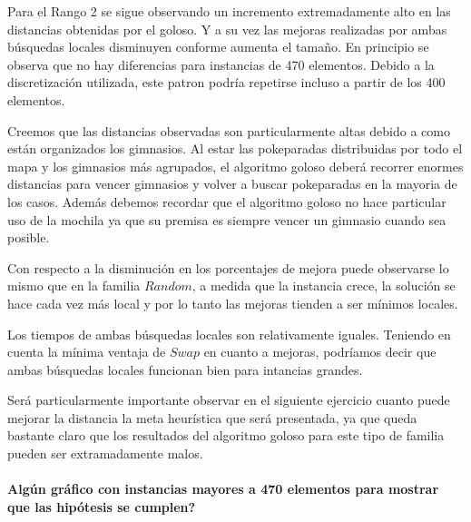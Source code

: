 Para el Rango 2 se sigue observando un incremento extremadamente alto en las distancias obtenidas por el goloso. Y a su vez las mejoras realizadas por ambas búsquedas locales disminuyen conforme aumenta el tamaño. En principio se observa que no hay diferencias para instancias de 470 elementos. Debido a la discretización utilizada, este patron podría repetirse incluso a partir de los 400 elementos.

Creemos que las distancias observadas son particularmente altas debido a como están organizados los gimnasios. Al estar las pokeparadas distribuidas por todo el mapa y los gimnasios más agrupados, el algoritmo goloso deberá recorrer enormes distancias para vencer gimnasios y volver a buscar pokeparadas en la mayoria de los casos. Además debemos recordar que el algoritmo goloso no hace particular uso de la mochila ya que su premisa es siempre vencer un gimnasio cuando sea posible.

Con respecto a la disminución en los porcentajes de mejora puede observarse lo mismo que en la familia $Random$, a medida que la instancia crece, la solución se hace cada vez más local y por lo tanto las mejoras tienden a ser mínimos locales. 

Los tiempos de ambas búsquedas locales son relativamente iguales. Teniendo en cuenta la mínima ventaja de $Swap$ en cuanto a mejoras, podríamos decir que ambas búsquedas locales funcionan bien para intancias grandes.

Será particularmente importante observar en el siguiente ejercicio cuanto puede mejorar la distancia la meta heurística que será presentada, ya que queda bastante claro que los resultados del algoritmo goloso para este tipo de familia pueden ser extramadamente malos. 
\\\\

\textbf{Algún gráfico con instancias mayores a 470 elementos para mostrar que las hipótesis se cumplen?}